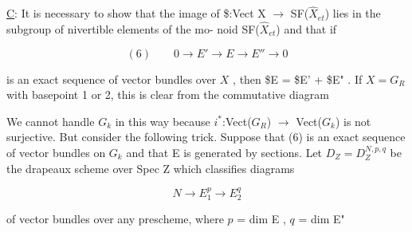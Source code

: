 
\uline{C}: It is necessary to show that the image of \$:Vect X $\rightarrow$
SF($\hat{X}_{et}$) lies in the subgroup of nivertible elements of the mo-%
noid SF($\hat{X}_{et}$) and that if

\[ (6) \qquad 0 \rightarrow E' \rightarrow E \rightarrow E'' \rightarrow 0 \]

is an exact sequence of vector bundles over $X$ , then \$E =
\$E' + \$E" . If $X = G_R$ with basepoint 1 or 2, this is clear from
the commutative diagram


We cannot handle $G_k$ in this way because $i^*$:Vect($G_R$) $\rightarrow$ Vect($G_k$)
is not surjective. But consider the following trick. Suppose
that (6) is an exact sequence of vector bundles on $G_k$ and that
E is generated by sections. Let $D_Z = D_Z^{N,p,q}$ be the drapeaux
scheme over Spec Z which classifies diagrams

\[ N \rightarrow E_1^p \rightarrow E_2^q \]

of vector bundles over any prescheme, where $p$ = dim E , $q$ = dim E"

